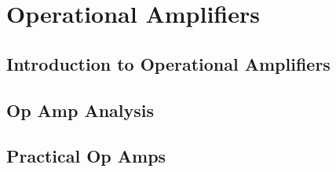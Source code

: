 \chapter{Operational Amplifiers}
\label{cha:op_amps}
    \section{Introduction to Operational Amplifiers}
    \section{Op Amp Analysis}
    \section{Practical Op Amps}